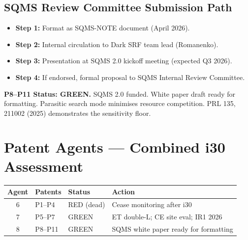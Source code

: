 \documentclass[11pt,a4paper]{article}
\begin{document}
\subsection{SQMS Review Committee Submission Path}

\begin{itemize}
\item \textbf{Step 1:} Format as SQMS-NOTE document (April 2026).
\item \textbf{Step 2:} Internal circulation to Dark SRF team lead (Romanenko).
\item \textbf{Step 3:} Presentation at SQMS 2.0 kickoff meeting (expected Q3 2026).
\item \textbf{Step 4:} If endorsed, formal proposal to SQMS Internal Review Committee.
\end{itemize}

\textbf{P8--P11 Status: GREEN.} SQMS 2.0 funded. White paper draft ready for formatting. Parasitic search mode minimises resource competition. PRL 135, 211002 (2025) demonstrates the sensitivity floor.

\section{Patent Agents --- Combined i30 Assessment}

\begin{center}
\begin{tabular}{clll}
\toprule
\textbf{Agent} & \textbf{Patents} & \textbf{Status} & \textbf{Action} \\
\midrule
6 & P1--P4 & RED (dead) & Cease monitoring after i30 \\
7 & P5--P7 & GREEN & ET double-L; CE site eval; IR1 2026 \\
8 & P8--P11 & GREEN & SQMS white paper ready for formatting \\
\bottomrule
\end{tabular}
\end{center}
\end{document}
